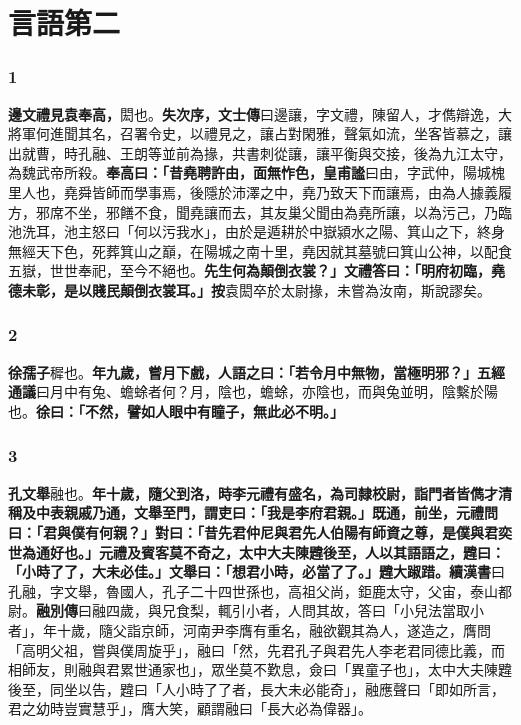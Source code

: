 \chapter{言語第二}

\subsection*{1}

\textbf{邊文禮見袁奉高，}{\footnotesize 閎也。}\textbf{失次序，}{\footnotesize \textbf{文士傳}曰邊讓，字文禮，陳留人，才儁辯逸，大將軍何進聞其名，召署令史，以禮見之，讓占對閑雅，聲氣如流，坐客皆慕之，讓出就曹，時孔融、王朗等並前為掾，共書刺從讓，讓平衡與交接，後為九江太守，為魏武帝所殺。}\textbf{奉高曰：「昔堯聘許由，面無怍色，}{\footnotesize \textbf{皇甫謐}曰由，字武仲，陽城槐里人也，堯舜皆師而學事焉，後隱於沛澤之中，堯乃致天下而讓焉，由為人據義履方，邪席不坐，邪饍不食，聞堯讓而去，其友巢父聞由為堯所讓，以為污己，乃臨池洗耳，池主怒曰「何以污我水」，由於是遁耕於中嶽潁水之陽、箕山之下，終身無經天下色，死葬箕山之巔，在陽城之南十里，堯因就其墓號曰箕山公神，以配食五嶽，世世奉祀，至今不絕也。}\textbf{先生何為顛倒衣裳？」文禮答曰：「明府初臨，堯德未彰，是以賤民顛倒衣裳耳。」}{\footnotesize \textbf{按}袁閎卒於太尉掾，未嘗為汝南，斯說謬矣。}

\subsection*{2}

\textbf{徐孺子}{\footnotesize 穉也。}\textbf{年九歲，嘗月下戲，人語之曰：「若令月中無物，當極明邪？」}{\footnotesize \textbf{五經通議}曰月中有兔、蟾蜍者何？月，陰也，蟾蜍，亦陰也，而與兔並明，陰繫於陽也。}\textbf{徐曰：「不然，譬如人眼中有瞳子，無此必不明。」}

\subsection*{3}

\textbf{孔文舉}{\footnotesize 融也。}\textbf{年十歲，隨父到洛，時李元禮有盛名，為司隸校尉，詣門者皆儁才清稱及中表親戚乃通，文舉至門，謂吏曰：「我是李府君親。」既通，前坐，元禮問曰：「君與僕有何親？」對曰：「昔先君仲尼與君先人伯陽有師資之尊，是僕與君奕世為通好也。」元禮及賓客莫不奇之，太中大夫陳韙後至，人以其語語之，韙曰：「小時了了，大未必佳。」文舉曰：「想君小時，必當了了。」韙大踧踖。}{\footnotesize \textbf{續漢書}曰孔融，字文舉，魯國人，孔子二十四世孫也，高祖父尚，鉅鹿太守，父宙，泰山都尉。\textbf{融別傳}曰融四歲，與兄食梨，輒引小者，人問其故，答曰「小兒法當取小者」，年十歲，隨父詣京師，河南尹李膺有重名，融欲觀其為人，遂造之，膺問「高明父祖，嘗與僕周旋乎」，融曰「然，先君孔子與君先人李老君同德比義，而相師友，則融與君累世通家也」，眾坐莫不歎息，僉曰「異童子也」，太中大夫陳韙後至，同坐以告，韙曰「人小時了了者，長大未必能奇」，融應聲曰「即如所言，君之幼時豈實慧乎」，膺大笑，顧謂融曰「長大必為偉器」。}

